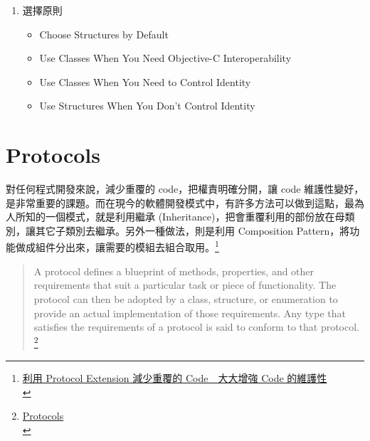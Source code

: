 \documentclass[a4paper,12pt]{article}
\begin{document}
\begin{enumerate}
\item 選擇原則
\label{sec:org1efa312}
\begin{itemize}
\item Choose Structures by Default\\
\item Use Classes When You Need Objective-C Interoperability\\
\item Use Classes When You Need to Control Identity\\
\item Use Structures When You Don't Control Identity\\
\end{itemize}
\end{enumerate}

\section{Protocols}
\label{sec:org404fe19}
對任何程式開發來說，減少重覆的 code，把權責明確分開，讓 code 維護性變好，是非常重要的課題。而在現今的軟體開發模式中，有許多方法可以做到這點，最為人所知的一個模式，就是利用繼承 (Inheritance)，把會重覆利用的部份放在母類別，讓其它子類別去繼承。另外一種做法，則是利用 Composition Pattern，將功能做成組件分出來，讓需要的模組去組合取用。\footnote{\href{https://www.appcoda.com.tw/protocol-extension/}{利用 Protocol Extension 減少重覆的 Code　大大增強 Code 的維護性}\\}\\
\begin{verse}
A protocol defines a blueprint of methods, properties, and other requirements that suit a particular task or piece of functionality. The protocol can then be adopted by a class, structure, or enumeration to provide an actual implementation of those requirements. Any type that satisfies the requirements of a protocol is said to conform to that protocol. \footnote{\href{https://docs.swift.org/swift-book/LanguageGuide/Protocols.html}{Protocols}\\}\\
\end{verse}
\end{document}
